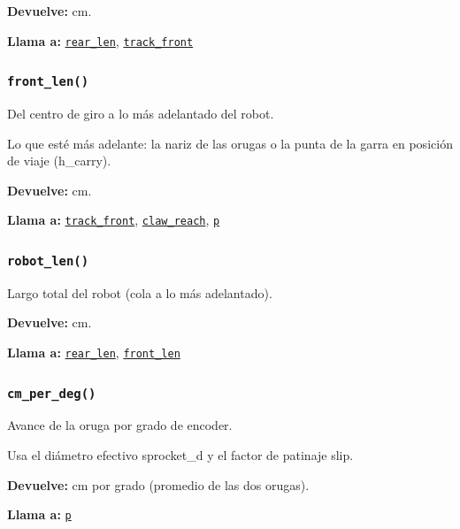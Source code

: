 \noindent\textbf{Devuelve:} cm.\par
\noindent\textbf{Llama a:} \hyperref[fn:geometry:rear-len]{\texttt{rear\_\allowbreak{}len}}, \hyperref[fn:geometry:track-front]{\texttt{track\_\allowbreak{}front}}\par

\subsubsection{\texttt{front\_\allowbreak{}len()}}\label{fn:geometry:front-len}
\noindent Del centro de giro a lo más adelantado del robot.

Lo que esté más adelante: la nariz de las orugas o la punta de la garra en posición de viaje (h\_carry).

\noindent\textbf{Devuelve:} cm.\par
\noindent\textbf{Llama a:} \hyperref[fn:geometry:track-front]{\texttt{track\_\allowbreak{}front}}, \hyperref[fn:geometry:claw-reach]{\texttt{claw\_\allowbreak{}reach}}, \hyperref[fn:geometry:p]{\texttt{p}}\par

\subsubsection{\texttt{robot\_\allowbreak{}len()}}\label{fn:geometry:robot-len}
\noindent Largo total del robot (cola a lo más adelantado).

\noindent\textbf{Devuelve:} cm.\par
\noindent\textbf{Llama a:} \hyperref[fn:geometry:rear-len]{\texttt{rear\_\allowbreak{}len}}, \hyperref[fn:geometry:front-len]{\texttt{front\_\allowbreak{}len}}\par

\subsubsection{\texttt{cm\_\allowbreak{}per\_\allowbreak{}deg()}}\label{fn:geometry:cm-per-deg}
\noindent Avance de la oruga por grado de encoder.

Usa el diámetro efectivo sprocket\_d y el factor de patinaje slip.

\noindent\textbf{Devuelve:} cm por grado (promedio de las dos orugas).\par
\noindent\textbf{Llama a:} \hyperref[fn:geometry:p]{\texttt{p}}\par

